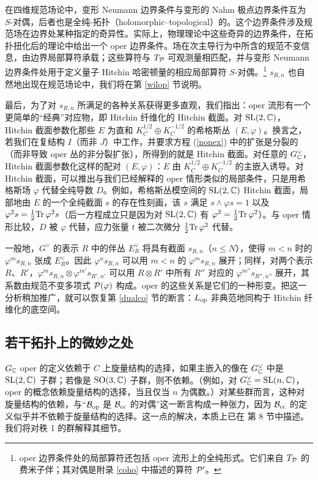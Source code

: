 在四维规范场论中，变形 Neumann 边界条件与变形的 Nahm 极点边界条件互为 $S$-对偶，后者也是全纯-拓扑（holomorphic–topological）的。这个边界条件涉及规范场在边界处某种指定的奇异性。实际上，物理理论中这些奇异的边界条件，在拓扑扭化后的理论中给出一个 oper 边界条件。场在次主导行为中所含的规范不变信息，由边界局部算符承载；这些算符与 $T_{\cal P}$ 可观测量相匹配，并与变形 Neumann 边界条件处用于定义量子 Hitchin 哈密顿量的相应局部算符 $S$-对偶。\footnote{oper 边界条件处的局部算符还包括 oper 流形上的全纯形式。它们来自 $T_{\cal P}$ 的费米子伴；其对偶是附录 \ref{coho} 中描述的算符 $\cal P'$。} $s_{R,n}$ 也自然地出现在规范场论中，我们将在第 \ref{wilop} 节说明。

最后，为了对 $s_{R,n}$ 所满足的各种关系获得更多直观，我们指出：oper 流形有一个更简单的“经典”对应物，即 Hitchin 纤维化的 Hitchin 截面。对 $\SL(2,\C)$，Hitchin 截面参数化那些 $E$ 为直和 $K_C^{1/2} \oplus K_C^{-1/2}$ 的希格斯丛 $(E,\varphi)$。换言之，若我们在复结构 $I$（而非 $J$）中工作，并要求方程 (\ref{nonex}) 中的扩张是分裂的（而非导致 oper 丛的非分裂扩张），所得到的就是 Hitchin 截面。对任意的 $G^\vee_\C$，Hitchin 截面参数化这样的配对 $(E,\varphi)$：$E$ 由 $K_C^{1/2} \oplus K_C^{-1/2}$ 的主嵌入诱导。对 Hitchin 截面，可以推出与我们已经解释的 oper 情形类似的局部条件，只是用希格斯场 $\varphi$ 代替全纯导数 $D$。例如，希格斯丛模空间的 $\SL(2,\C)$ Hitchin 截面，局部地由 $E$ 的一个全纯截面 $s$ 的存在性刻画，该 $s$ 满足 $s \wedge \varphi s=1$ 以及 $\varphi^2 s = \frac12 \Tr\, \varphi^2 s$（后一方程成立只是因为对 $\SL(2,\C)$ 有 $\varphi^2=\frac12 \Tr\, \varphi^2$）。与 oper 情形比较，$D$ 被 $\varphi$ 代替，应力张量 $t$ 被二次微分 $\frac12\Tr\,\varphi^2$ 代替。

一般地，$G^\vee$ 的表示 $R$ 中的伴丛 $E^\vee_R$ 将具有截面 $s_{R,n}$（$n\leq N$），使得 $m<n$ 时的 $\varphi^m s_{R,n}$ 张成 $E^\vee_{R}$。因此 $\varphi^n s_{R,n}$ 可以用 $m<n$ 的 $\varphi^m s_{R,n}$ 展开；同样，对两个表示 $R$、$R'$，$\varphi^m s_{R,n} \otimes \varphi^{m'} s_{R',n'}$ 可以用 $R \otimes R'$ 中所有 $R''$ 对应的 $\varphi^{m''} s_{R'',n''}$ 展开，其系数由规范不变多项式 $\P(\varphi)$ 构成。oper 的这些关系是它们的一种形变。把这一分析稍加推广，就可以恢复第 \ref{dualco} 节的断言：$L_\op$ 非典范地同构于 Hitchin 纤维化的底空间。

\subsection{若干拓扑上的微妙之处}\label{toposubt}

$G_\C$ oper 的定义依赖于 $C$ 上旋量结构的选择，如果主嵌入的像在 $G_\C^\vee$ 中是 $\SL(2,\C)$ 子群；若像是 $\SO(3,\C)$ 子群，则不依赖。（例如，对 $G_\C^\vee=\SL(n,\C)$，oper 的概念依赖旋量结构的选择，当且仅当 $n$ 为偶数。）对某些群而言，这种对旋量结构的依赖，与“$\B_\op$ 是 $\B_\cc$ 的对偶”这一断言构成一种张力，因为 $\B_\cc$ 的定义似乎并不依赖于旋量结构的选择。这一点的解决，本质上已在 \cite{FG} 第 8 节中描述。我们将对秩 1 的群解释其细节。


